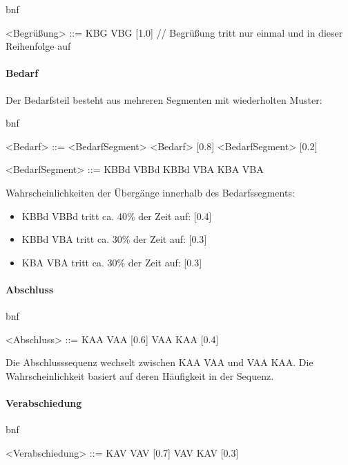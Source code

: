 \documentclass[
]{article}
\begin{document}
bnf

\textless Begrüßung\textgreater{} ::= KBG VBG {[}1.0{]} // Begrüßung
tritt nur einmal und in dieser Reihenfolge auf

\paragraph{\texorpdfstring{\textbf{Bedarf}}{Bedarf}}\label{bedarf}

Der Bedarfsteil besteht aus mehreren Segmenten mit wiederholten Muster:

bnf

\textless Bedarf\textgreater{} ::= \textless BedarfSegment\textgreater{}
\textless Bedarf\textgreater{} {[}0.8{]} \textbar{}
\textless BedarfSegment\textgreater{} {[}0.2{]}

\textless BedarfSegment\textgreater{} ::= KBBd VBBd \textbar{} KBBd VBA
\textbar{} KBA VBA

Wahrscheinlichkeiten der Übergänge innerhalb des Bedarfssegments:

\begin{itemize}
\item
  KBBd VBBd tritt ca. 40\% der Zeit auf: {[}0.4{]}
\item
  KBBd VBA tritt ca. 30\% der Zeit auf: {[}0.3{]}
\item
  KBA VBA tritt ca. 30\% der Zeit auf: {[}0.3{]}
\end{itemize}

\paragraph{\texorpdfstring{\textbf{Abschluss}}{Abschluss}}\label{abschluss}

bnf

\textless Abschluss\textgreater{} ::= KAA VAA {[}0.6{]} \textbar{} VAA
KAA {[}0.4{]}

Die Abschlusssequenz wechselt zwischen KAA VAA und VAA KAA. Die
Wahrscheinlichkeit basiert auf deren Häufigkeit in der Sequenz.

\paragraph{\texorpdfstring{\textbf{Verabschiedung}}{Verabschiedung}}\label{verabschiedung}

bnf

\textless Verabschiedung\textgreater{} ::= KAV VAV {[}0.7{]} \textbar{}
VAV KAV {[}0.3{]}
\end{document}
